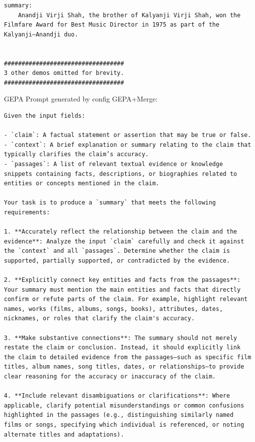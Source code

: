 \begin{instructbox}
\begin{lstlisting}[breakindent=0pt, breaklines=true, breakatwhitespace=true, frame=single, backgroundcolor=\color{green!10}]
summary:
    Anandji Virji Shah, the brother of Kalyanji Virji Shah, won the Filmfare Award for Best Music Director in 1975 as part of the Kalyanji–Anandji duo.


##################################
3 other demos omitted for brevity.
##################################

\end{lstlisting}

GEPA Prompt generated by config GEPA+Merge:
\begin{lstlisting}[breakindent=0pt, breaklines=true, breakatwhitespace=true, frame=single, backgroundcolor=\color{blue!10}]
Given the input fields:

- `claim`: A factual statement or assertion that may be true or false.
- `context`: A brief explanation or summary relating to the claim that typically clarifies the claim’s accuracy.
- `passages`: A list of relevant textual evidence or knowledge snippets containing facts, descriptions, or biographies related to entities or concepts mentioned in the claim.

Your task is to produce a `summary` that meets the following requirements:

1. **Accurately reflect the relationship between the claim and the evidence**: Analyze the input `claim` carefully and check it against the `context` and all `passages`. Determine whether the claim is supported, partially supported, or contradicted by the evidence.

2. **Explicitly connect key entities and facts from the passages**: Your summary must mention the main entities and facts that directly confirm or refute parts of the claim. For example, highlight relevant names, works (films, albums, songs, books), attributes, dates, nicknames, or roles that clarify the claim's accuracy.

3. **Make substantive connections**: The summary should not merely restate the claim or conclusion. Instead, it should explicitly link the claim to detailed evidence from the passages—such as specific film titles, album names, song titles, dates, or relationships—to provide clear reasoning for the accuracy or inaccuracy of the claim.

4. **Include relevant disambiguations or clarifications**: Where applicable, clarify potential misunderstandings or common confusions highlighted in the passages (e.g., distinguishing similarly named films or songs, specifying which individual is referenced, or noting alternate titles and adaptations).


\end{lstlisting}
\end{instructbox}
